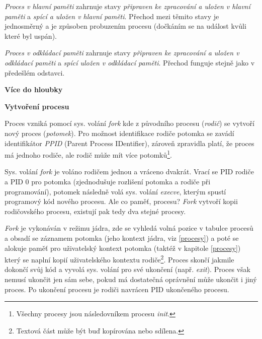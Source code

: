\textit{Proces v hlavní paměti} zahrnuje stavy \textit{připraven ke zpracování a uložen v hlavní paměti} a \textit{spící a uložen v hlavní paměti}. Přechod mezi těmito stavy je jednosměrný a je způsoben probuzením procesu (dočkáním se na událost kvůli které byl uspán).

\vspace{0,5cm}

\textit{Proces v odkládací paměti} zahrnuje stavy \textit{připraven ke zpracování a uložen v odkládací paměti} a \textit{spící uložen v odkládací paměti}. Přechod funguje stejně jako v předešlém odstavci. 

\begin{Large}
    \vspace{0,5cm}    
    \textbf{Více do hloubky}
\end{Large}

\begin{large}
    \vspace{0,5cm}
    \textbf{Vytvoření procesu}
\end{large}

Proces vzniká pomocí sys. volání \textit{fork} kde z původního procesu (\textit{rodič}) se vytvoří nový proces (\textit{potomek}). Pro možnost identifikace rodiče potomka se zavádí identifikátor \textit{PPID} (Parent Process IDentifier), zároveň zpravidla platí, že proces má jednoho rodiče, ale rodič může mít více potomků\footnote{Všechny procesy jsou následovníkem procesu \textit{init}.}. 

\vspace{0,5cm}

Sys. volání \textit{fork} je voláno rodičem jednou a vráceno dvakrát. Vrací se PID rodiče a PID 0 pro potomka (zjednodušuje rozlišení potomka a rodiče při programování), potomek následně volá sys. volání \textit{execve}, kterým spustí programový kód nového procesu. Ale co paměť, procesu? \textit{Fork} vytvoří kopii rodičovského procesu, existují pak tedy dva stejné procesy.

\vspace{0,5cm}

\textit{Fork} je vykonáván v režimu jádra, zde se vyhledá volná pozice v tabulce procesů a obsadí se záznamem potomka (jeho kontext jádra, viz \ref{procesy}) a poté se alokuje paměť pro uživatelský kontext potomka (taktéž v kapitole \ref{procesy}) který se naplní kopií uživatelského kontextu rodiče\footnote{Textová část může být buď kopírována nebo sdílena.}. Proces skončí jakmile dokončí svůj kód a vyvolá sys. volání pro své ukončení (např. \textit{exit}). Proces však nemusí ukončit jen sám sebe, pokud má dostatečná oprávnění může ukončit i jiný proces. Po ukončení procesu je rodiči navrácen PID ukončeného procesu. 

